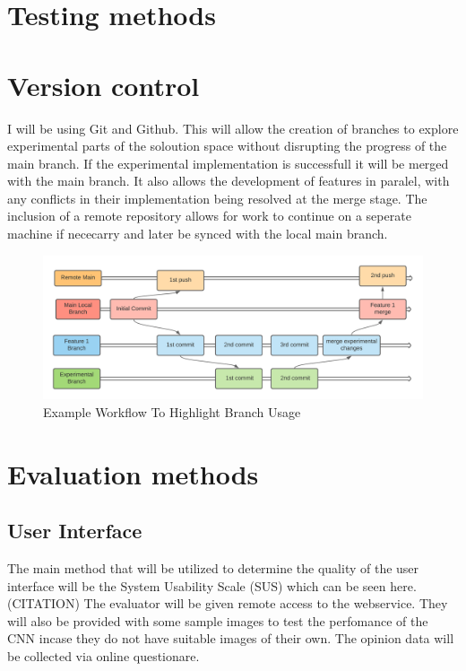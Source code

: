 \section{Testing methods}

\section{Version control}
  I will be using Git and Github. This will allow the creation of branches to explore experimental parts of the soloution space without disrupting the progress of the main branch. If the experimental implementation is successfull it will be merged with the main branch. It also allows the development of features in paralel, with any conflicts in their implementation being resolved at the merge stage. The inclusion of a remote repository allows for work to continue on a seperate machine if nececarry and later be synced with the local main branch.
  \begin{figure}[H]
    \begin{center}
      \includegraphics[scale=0.7]{Images/Git_Workflow_Diagram}
      \caption{Example Workflow To Highlight Branch Usage}
      \label{fig:Git Workflow}
    \end{center}
  \end{figure}

\section{Evaluation methods}
  \subsection{User Interface}
  The main method that will be utilized to determine the quality of the user interface will be the System Usability Scale (SUS) which can be seen here. (CITATION) %
  The evaluator will be given remote access to the webservice. They will also be provided with some sample images to test the perfomance of the CNN incase they do not have suitable images of their own.
  The opinion data will be collected via online questionare.
